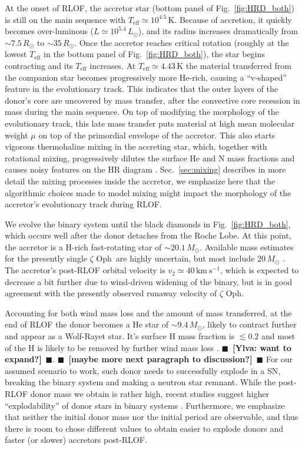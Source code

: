 \documentclass[twocolumn,twocolappendix,trackchanges]{aastex63}
\newcommand{\kms}{{\mathrm{km\ s^{-1}}}}
\DeclareRobustCommand{\Figref}[1]{Fig.~\ref{#1}}
\DeclareRobustCommand{\Secref}[1]{Sec.~\ref{#1}}
\newcommand{\zoph}{$\zeta$ Oph}
\newcommand{\todo}[1]{{\large $\blacksquare$~\textbf{\color{red}[#1]}}~$\blacksquare$}
\begin{document}
At the onset of RLOF, the accretor star (bottom panel of
\Figref{fig:HRD_both}) is still on the main sequence with
$T_\mathrm{eff}\simeq10^{4.5}$\,K. Because of accretion,
it quickly becomes over-luminous ($L\simeq10^{5.4}\,L_\odot$), and its
radius increases dramatically from $\sim7.5\,R_\odot$ to
$\sim35\,R_\odot$. Once the accretor reaches critical rotation
(roughly at the lowest $T_\mathrm{eff}$ in the bottom panel of
\Figref{fig:HRD_both}), the star begins contracting and its
$T_\mathrm{eff}$ increases. At $T_\mathrm{eff}\simeq 4.{43}$\,K the
material transferred from the companion star becomes progressively
more He-rich, causing a ``v-shaped'' feature in the evolutionary
track. This indicates that the outer layers of the donor's core are
uncovered by mass transfer, after the convective core recession in
mass during the main sequence. On top of modifying the morphology of
the evolutionary track, this late mass transfer puts material at high
mean molecular weight $\mu$ on top of the primordial envelope of the
accretor. This also starts vigorous thermohaline mixing in the
accreting star, which, together with rotational mixing, progressively
dilutes the surface He and N mass fractions and causes noisy features on the
HR diagram \citep[e.g.,][]{cantiello:07}. \Secref{sec:mixing}
describes in more detail the mixing processes inside the accretor, we
emphasize here that the algorithmic choices made to model mixing might
impact the morphology of the accretor's evolutionary track during
RLOF.

We evolve the binary system until the black diamonds in
\Figref{fig:HRD_both}, which occurs well after the donor detaches from
the Roche Lobe. At this point, the accretor is a H-rich fast-rotating
star of
$\sim$$20.1\,M_\odot$. Available mass estimates for the presently single \zoph\ are highly uncertain, but most include
$20\,M_\odot$ \citep[e.g.,][]{hoogerwerf:01, villamariz:05, neuhauser:20}. The accretor's post-RLOF orbital velocity is
$v_2\simeq40\,\kms$, which is expected to decrease a bit further due to wind-driven widening of the binary, but is in good agreement with the presently observed runaway velocity of \zoph.

Accounting for both wind mass loss and the amount of mass transferred, at the end of RLOF the donor becomes a He star of
$\sim$$9.4\,M_\odot$, likely to contract further and appear as a
Wolf-Rayet star. It's surface H mass fraction is $\lesssim 0.2$ and
most of the H is likely to be removed by further wind mass loss
\citep[e.g.,][]{gotberg:17}. \todo{Ylva: want to expand?}.
\todo{maybe more next paragraph to discussion?} For our assumed scenario to work, such donor needs to successfully
explode in a SN, breaking the binary system and making a neutron star
remnant. While the post-RLOF donor mass we obtain is rather high, recent studies
suggest higher ``explodability'' of donor stars in binary systems
\citep[e.g.,][]{schneider:21, laplace:21, vartanyan:21}. Furthermore, we
emphasize that neither the initial donor mass nor the initial period are
observable, and thus there is room to chose different values to obtain
easier to explode donors and faster (or slower) accretors post-RLOF.
\end{document}
